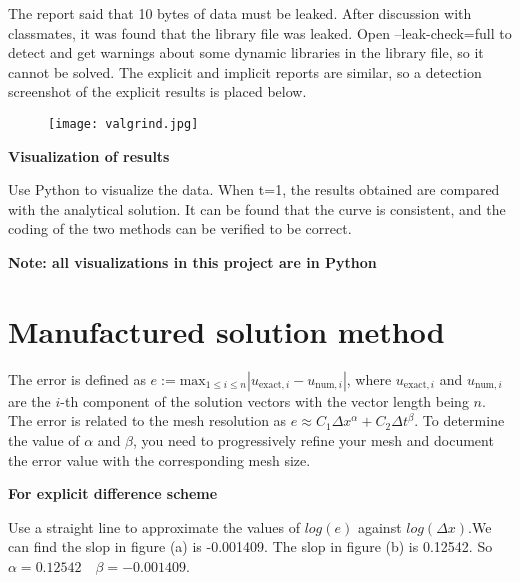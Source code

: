 \documentclass[a4paper]{article}
\begin{document}
        The report said that 10 bytes of data must be leaked. After discussion with classmates, it was found that the library file was leaked.
        Open --leak-check=full to detect and get warnings about some dynamic libraries in the library file, so it cannot be solved.
        The explicit and implicit reports are similar, so a detection screenshot of the explicit results is placed below.
        \begin{figure}[H] 
            \centering 
            \texttt{[image: valgrind.jpg]} 
            \label{Fig.valgrind1} 
        \end{figure}
        \textbf{Visualization of results}
        \begin{figure}[H]
            \centering  
            \label{Fig.data}
        \end{figure}
        Use Python to visualize the data. When t=1, the results obtained are compared with the analytical solution. It can be found that the curve is consistent, and the coding of the two methods can be verified to be correct.
        
        \textbf{Note: all visualizations in this project are in Python}
    \section{Manufactured solution method}
        The error is defined as $e := \mathrm{max}_{1 \leq i \leq n} |  u_{\mathrm{exact}, i} -  u_{\mathrm{num}, i}| $, where $u_{\mathrm{exact}, i}$ and $u_{\mathrm{num}, i}$ are the $i$-th component of the solution vectors with the vector length being $n$. The error is related to the mesh resolution as $e \approx C_1 \Delta x^{\alpha} + C_2 \Delta t^{\beta}$. To determine the value of $\alpha$ and $\beta$, you need to progressively refine your mesh and document the error value with the corresponding mesh size. 

        \textbf{For explicit difference scheme}
        \begin{figure}[H]
            \centering  
            \label{Fig.error1}
        \end{figure}
        Use a straight line to approximate the values of $log(e)$ against $log(\Delta x)$.We can find the slop in figure (a) is -0.001409. The slop in figure (b) is 0.12542. So $\alpha=0.12542 \quad \beta=-0.001409$.  
        
\end{document}
